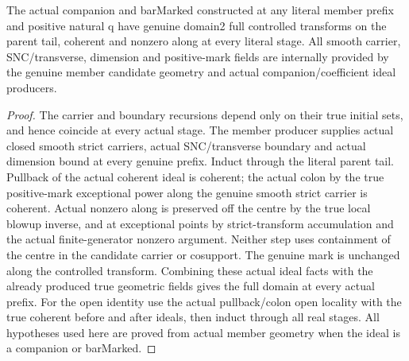 \begin{lemma}
\label{hir:member-companion-actual-same-geometry-extension}
\leanok
The actual companion and barMarked constructed at any literal member prefix
and positive natural q have genuine domain2 full controlled transforms on
the parent tail, coherent and nonzero along at every literal stage.
All smooth carrier, SNC/transverse, dimension and positive-mark fields are
internally provided by the genuine member candidate geometry and actual
companion/coefficient ideal producers.
\end{lemma}
\begin{proof}
The carrier and boundary recursions depend only on their true initial sets,
and hence coincide at every actual stage. The member producer supplies actual
closed smooth strict carriers, actual SNC/transverse boundary and actual
dimension bound at every genuine prefix. Induct through the literal parent
tail. Pullback of the actual coherent ideal is coherent; the actual colon by
the true positive-mark exceptional power along the genuine smooth strict
carrier is coherent. Actual nonzero along is preserved off the centre by the
true local blowup inverse, and at exceptional points by strict-transform
accumulation and the actual finite-generator nonzero argument. Neither step
uses containment of the centre in the candidate carrier or cosupport.
The genuine mark is unchanged along the controlled transform. Combining
these actual ideal facts with the already produced true geometric fields
gives the full domain at every actual prefix. For the open identity use the
actual pullback/colon open locality with the true coherent before and after
ideals, then induct through all real stages. All hypotheses used here are
proved from actual member geometry when the ideal is a companion or barMarked.
\end{proof}

